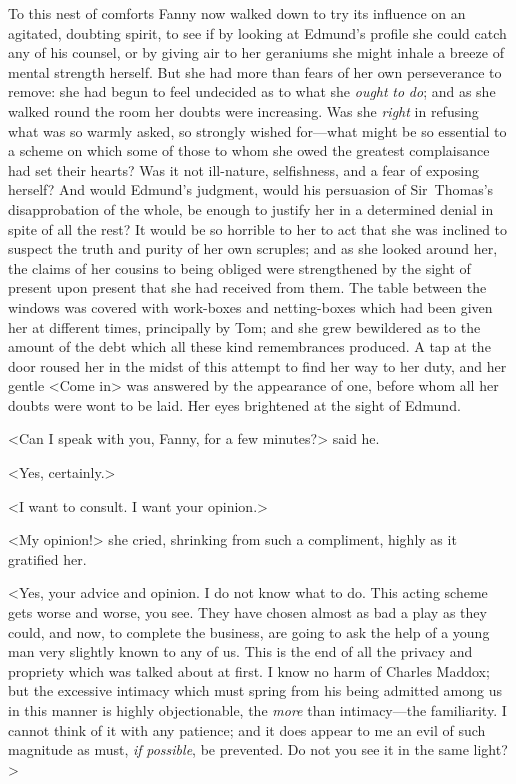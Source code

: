 To this nest of comforts Fanny now walked down to try its influence on an agitated, doubting spirit, to see if by looking at Edmund's profile she could catch any of his counsel, or by giving air to her geraniums she might inhale a breeze of mental strength herself. But she had more than fears of her own perseverance to remove: she had begun to feel undecided as to what she \textit{ought}  \textit{to}  \textit{do}; and as she walked round the room her doubts were increasing. Was she \textit{right}  in refusing what was so warmly asked, so strongly wished for—what might be so essential to a scheme on which some of those to whom she owed the greatest complaisance had set their hearts? Was it not ill-nature, selfishness, and a fear of exposing herself? And would Edmund's judgment, would his persuasion of Sir~Thomas's disapprobation of the whole, be enough to justify her in a determined denial in spite of all the rest? It would be so horrible to her to act that she was inclined to suspect the truth and purity of her own scruples; and as she looked around her, the claims of her cousins to being obliged were strengthened by the sight of present upon present that she had received from them. The table between the windows was covered with work-boxes and netting-boxes which had been given her at different times, principally by Tom; and she grew bewildered as to the amount of the debt which all these kind remembrances produced. A tap at the door roused her in the midst of this attempt to find her way to her duty, and her gentle <Come in> was answered by the appearance of one, before whom all her doubts were wont to be laid. Her eyes brightened at the sight of Edmund.

<Can I speak with you, Fanny, for a few minutes?> said he.

<Yes, certainly.>

<I want to consult. I want your opinion.>

<My opinion!> she cried, shrinking from such a compliment, highly as it gratified her.

<Yes, your advice and opinion. I do not know what to do. This acting scheme gets worse and worse, you see. They have chosen almost as bad a play as they could, and now, to complete the business, are going to ask the help of a young man very slightly known to any of us. This is the end of all the privacy and propriety which was talked about at first. I know no harm of Charles Maddox; but the excessive intimacy which must spring from his being admitted among us in this manner is highly objectionable, the \textit{more}  than intimacy—the familiarity. I cannot think of it with any patience; and it does appear to me an evil of such magnitude as must, \textit{if}  \textit{possible}, be prevented. Do not you see it in the same light?>

